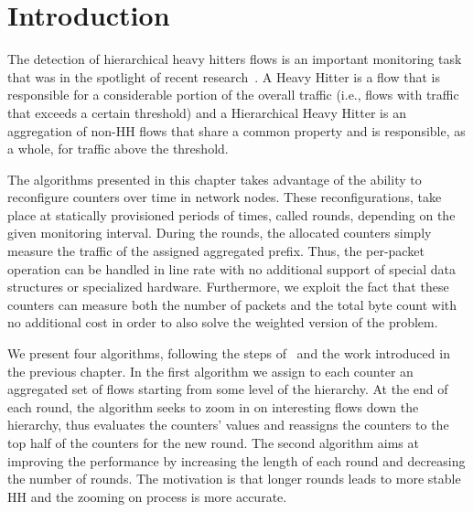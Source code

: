 \section{Introduction}

The detection of hierarchical heavy hitters flows is an important monitoring task that was in the spotlight of recent research~\cite{ben2016heavy, basat2017optimal, ben2017constant, sivaraman2017heavy, HHHOnline, tong2015high}. A Heavy Hitter is a flow that is responsible for a considerable portion of the  overall traffic (i.e., flows with traffic that exceeds a certain threshold) and a Hierarchical Heavy Hitter is an aggregation of non-HH flows that share a common property and is responsible, as a whole, for traffic above the threshold.

The algorithms presented in this chapter takes advantage of the ability to reconfigure counters over time in network nodes. These reconfigurations, take place at statically provisioned periods of times, called rounds, depending on the given monitoring interval.
During the rounds, the allocated counters simply measure the traffic of the assigned aggregated prefix. Thus, the per-packet operation can be handled in line rate with no additional support of special data structures or specialized hardware. Furthermore, we exploit the fact that these counters can measure both the number of packets and the total byte count with no additional cost in order to also solve the weighted version of the problem.

We present four algorithms, following the steps of~\cite{conf/sigcomm/YuanCM07,Moraney2016} and the work introduced in the previous chapter. In the first algorithm we assign to each counter an aggregated set of flows starting from some level of the hierarchy. At the end of each round, the algorithm seeks to zoom in on interesting flows down the hierarchy,  thus evaluates the counters' values and reassigns the counters to the top half of the counters for the new round. The second algorithm aims at improving the performance by increasing the length of each round and decreasing the number of rounds. The motivation is that longer rounds leads to more stable HH and the zooming on process is more accurate.

